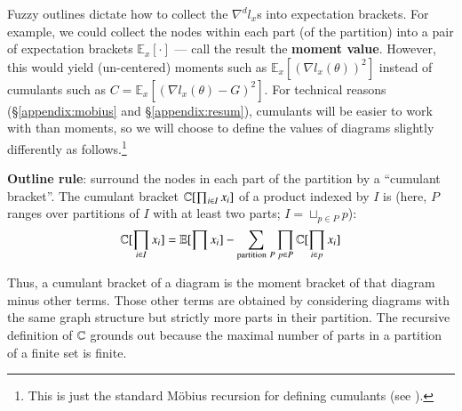 \documentclass[anon,12pt]{colt2021} %
\newcommand{\wasq}[1]{\left[#1\right]}
\newcommand{\nb} { \nabla }
\newcommand{\lx} { l_x(\theta) }
\newcommand{\ex}[1] { \expc_x \wasq{#1} }
\newcommand{\expc}{\mathbb{E}}
\begin{document}
            Fuzzy outlines dictate how to collect the $\nabla^d l_x$s into
            expectation brackets.  For example, we could collect the nodes
            within each part (of the partition) into a pair of expectation
            brackets $\expc_x\wasq{\cdot}$ --- call the result the
            \textbf{moment value}.
            However, this would yield (un-centered)
            moments such as $\ex{(\nb\lx)^2}$ instead of cumulants such as
            $C=\ex{(\nb\lx - G)^2}$.
            For technical reasons (\S\ref{appendix:mobius} and
            \S\ref{appendix:resum}), cumulants will be easier to work with than
            moments, so we will choose to define the values of diagrams
            slightly differently as follows.\footnote{
                This is just the standard M\"obius recursion for defining cumulants
                (see \cite{ro64}).
            }
            \par
                \textbf{Outline rule}: surround the nodes in each part of the
                partition by a ``cumulant bracket''.  The cumulant bracket
                $\mathbb{C}[\prod_{i\in I} x_i]$ of a product indexed by $I$ is (here,
                $P$ ranges over partitions of $I$ with at least two parts; $I =
                \sqcup_{p\in P} p$):
                $$
                    \CC[\prod_{i\in I} x_i] = \expc[\prod x_i] - \sum_{\text{partition}~P} \prod_{p\in P} \CC[\prod_{i\in p} x_i]
                $$
            \par
            Thus, a cumulant bracket of a diagram is the moment bracket of that
            diagram minus other terms.  Those other terms are obtained by considering
            diagrams with the same graph structure but strictly more parts in their
            partition.  The recursive definition
            of $\mathbb{C}$ grounds out because the maximal number of parts in a
            partition of a finite set is finite.
\end{document}
